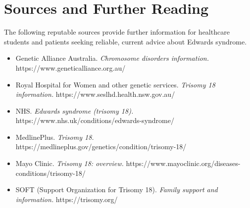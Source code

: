\section*{Sources and Further Reading}
The following reputable sources provide further information for healthcare students and patients seeking reliable, current advice about Edwards syndrome.
\begin{itemize}
    \item Genetic Alliance Australia. \textit{Chromosome disorders information.} https://www.geneticalliance.org.au/
    \item Royal Hospital for Women and other genetic services. \textit{Trisomy 18 information.} https://www.seslhd.health.nsw.gov.au/
    \item NHS. \textit{Edwards syndrome (trisomy 18).} https://www.nhs.uk/conditions/edwards-syndrome/
    \item MedlinePlus. \textit{Trisomy 18.} https://medlineplus.gov/genetics/condition/trisomy-18/
    \item Mayo Clinic. \textit{Trisomy 18: overview.} https://www.mayoclinic.org/diseases-conditions/trisomy-18/
    \item SOFT (Support Organization for Trisomy 18). \textit{Family support and information.} https://trisomy.org/
\end{itemize}
